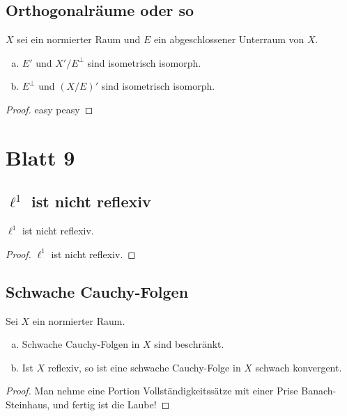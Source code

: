 \documentclass[FunkAnaSkript.tex]{subfiles}
\begin{document}
	
\subsection{ Orthogonalräume oder so}
\label{B8.4}
	$X$ sei ein normierter Raum und $E$ ein abgeschlossener Unterraum von $X$.
	\begin{enumerate}[(a)]
		\item $E'$ und $X'/E^\perp$ sind isometrisch isomorph.
		\item $E^\perp$ und $(X/E)'$ sind isometrisch isomorph.
	\end{enumerate}
	
	\begin{proof}
	easy peasy
	\end{proof}


\newpage 
\section{ Blatt 9}

\subsection{ $\ell^1$ ist nicht reflexiv}
\label{B9.1}
	$\ell^1$ ist nicht reflexiv.
	
	\begin{proof}
	$\ell^1$ ist nicht reflexiv.
	\end{proof}


\subsection{ Schwache Cauchy-Folgen}
\label{B9.2}
	Sei $X$ ein normierter Raum.
	\begin{enumerate}[(a)]
	\item Schwache Cauchy-Folgen in $X$ sind beschränkt.
	\item Ist $X$ reflexiv, so ist eine schwache Cauchy-Folge in $X$ schwach konvergent.	
	\end{enumerate}	 

	\begin{proof}
	Man nehme eine Portion Vollständigkeitssätze mit einer Prise Banach-Steinhaus, und fertig ist die Laube!
	\end{proof}
	
\end{document}
